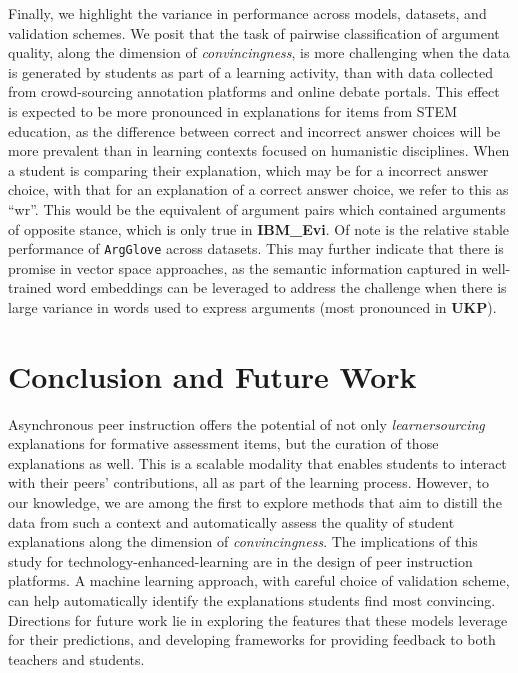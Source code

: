 \documentclass[runningheads]{llncs}
\begin{document}
Finally, we highlight the variance in performance across models, datasets, and 
validation schemes. We posit that the task of pairwise classification of 
argument quality, along the dimension of \textit{convincingness}, is more 
challenging when the data is generated by students as part of a learning 
activity, than with data collected from crowd-sourcing annotation platforms and 
online debate portals. 
This effect is expected to be more pronounced in explanations for items from 
STEM education, as the difference between correct and incorrect answer choices 
will be more prevalent than in learning contexts focused on humanistic 
disciplines.
When a student is comparing their explanation, which may be for a incorrect 
answer choice, with that for an explanation of a correct answer choice, we 
refer to this as ``wr''.
This would be the equivalent of argument pairs which contained arguments of 
opposite stance, which is only true in \textbf{IBM\_Evi}.  
Of note is the relative stable performance of \verb|ArgGlove| across datasets. 
This may further indicate that there is promise in vector space approaches, as 
the semantic information captured in well-trained word embeddings can be 
leveraged to address the challenge when there is large variance in words used 
to express arguments (most pronounced in \textbf{UKP}).


\section{Conclusion and Future Work}

Asynchronous peer instruction offers the potential of not only 
\textit{learnersourcing} explanations for formative assessment items, but the 
curation of those explanations as well.
This is a scalable modality that enables students to interact with their peers' 
contributions, all as part of the learning process.
However, to our knowledge, we are among the first to explore methods that aim 
to distill the data from such a context and automatically assess the quality of 
student explanations along the dimension of \textit{convincingness}.
The implications of this study for technology-enhanced-learning are in the 
design of peer instruction platforms.
A machine learning approach, with careful choice of validation scheme, can help 
automatically identify the explanations students find most convincing. 
Directions for future work lie in exploring the features that these models 
leverage for their predictions, and developing frameworks for providing 
feedback to both teachers and students.
\end{document}

